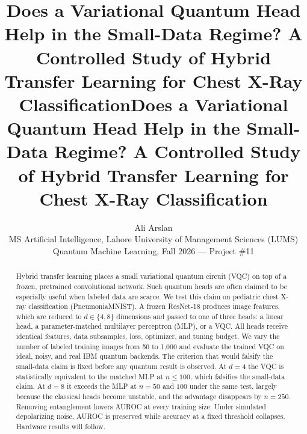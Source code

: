 \documentclass[conference]{IEEEtran}
\newcommand{\usingieee}{}
\begin{document}
\ifdefined\usingieee
\title{Does a Variational Quantum Head Help in the Small-Data Regime?
A Controlled Study of Hybrid Transfer Learning for Chest X-Ray Classification}
\author{
}
\maketitle
\else
\title{\vspace{-1.2em}\Large\bfseries Does a Variational Quantum Head Help in the Small-Data Regime?
A Controlled Study of Hybrid Transfer Learning for Chest X-Ray Classification}
\author{Ali Arslan\\ \small MS Artificial Intelligence, Lahore University of Management Sciences (LUMS)\\
\small Quantum Machine Learning, Fall 2026 --- Project \#11}
\date{\vspace{-2em}}
\maketitle
\fi

\begin{abstract}
Hybrid transfer learning places a small variational quantum circuit (VQC)
on top of a frozen, pretrained convolutional network. Such quantum heads are
often claimed to be especially useful when labeled data are scarce. We test
this claim on pediatric chest X-ray classification (PneumoniaMNIST). A frozen
ResNet-18 produces image features, which are reduced to $d\in\{4,8\}$
dimensions and passed to one of three heads: a linear head, a
parameter-matched multilayer perceptron (MLP), or a VQC. All heads receive
identical features, data subsamples, loss, optimizer, and tuning budget. We
vary the number of labeled training images from 50 to 1{,}000 and evaluate
the trained VQC on ideal, noisy, and real IBM quantum backends. The
criterion that would falsify the small-data claim is fixed before any
quantum result is observed. At $d=4$ the VQC is statistically equivalent
to the matched MLP at $n\le100$, which falsifies the small-data claim. At
$d=8$ it exceeds the MLP at $n=50$ and $100$ under the same test, largely
because the classical heads become unstable, and the advantage disappears
by $n=250$. Removing entanglement lowers AUROC at every training size.
Under simulated depolarizing noise, AUROC is preserved while accuracy at a
fixed threshold collapses. Hardware results will follow.
\end{abstract}
\end{document}
